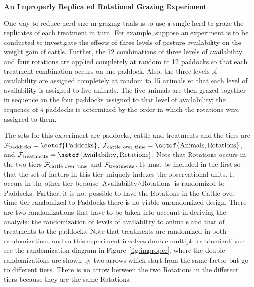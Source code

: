 \begin{flushleft}\Large\bf An Improperly Replicated Rotational Grazing Experiment
\end{flushleft}

One way to reduce herd size in grazing trials is to use a single
herd to graze the replicates of each treatment in turn.
For example, suppose an experiment is to be conducted to investigate the
effects of three levels of pasture availability on the weight gain of cattle.
Further, the 12 combinations of three levels of availability
and four rotations are
applied completely at random to 12 paddocks so that each treatment
combination occurs on one paddock.  Also, the three 
levels of availability are assigned
completely at random to 15 animals so that each %
level of availability is assigned to
five animals. The five animals are then grazed together
in sequence on the four paddocks assigned to that
level of availability; the sequence of 4 paddocks is determined by
the order in which the rotations were assigned to them.

The sets for this experiment are paddocks, cattle and treatments %
and the tiers are ${\cal F}_{\rm paddocks} = \setof{\mbox{Paddocks}}$,
${\cal F}_{\rm cattle\ over\ time} =
                   \setof{\mbox{Animals}, \mbox{Rotations}}$,
and ${\cal F}_{\rm treatments} =
                   \setof{\mbox{Availability}, \mbox{Rotations}}$.
Note that Rotations occurs in the two tiers
${\cal F}_{\rm cattle\ over\ time}$ and ${\cal F}_{\rm treatments}$.
It must be included in the first so that the set of factors in this tier
uniquely indexes the observational units. It occurs in the other tier because
$\mbox{Availability}\wedge\mbox{Rotations}$ is randomized to Paddocks.
Further, it is not possible to have the Rotations in the
Cattle-over-time tier randomized to Paddocks there is no viable unrandomized
design.
There are two randomizations that have to be taken into account in deriving
the analysis:  the randomization of levels of availability
to animals and that of treatments to the paddocks. Note that treatments are
randomized in both randomizations and so this experiment involves double
multiple randomizations: see the randomization diagram in
Figure~\ref{fig:improper}, where the
double randomizations are shown by two arrows which start from the same factor
but go to different tiers. There is no arrow between the two Rotations
in the different tiers because they are the same Rotations.

